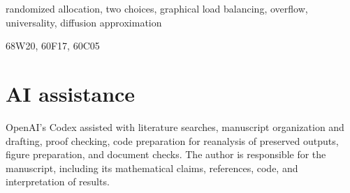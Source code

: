\documentclass[review,nohypdvips,hidelinks,onefignum,onetabnum]{siamart251216}
\begin{document}
\maketitle
\begin{abstract}
We determine which candidate information a reduced model must retain to predict
critical overflow in a fixed two-choice allocation rule.
Two communities of $q$ buckets have uniform bipartite internal sampling and
cross sampling of probability $\eps$. Each cross direction uses a predetermined
doubly stochastic kernel; ties favor the left endpoint.
For empty starts, $\eps q\to\lambda<\infty$, and integer capacity $c$ with
$2c/q\to\kappa>0$, we prove a common joint limit for imbalance and the
overflow curve on the $q^2$ arrival scale.
A coupling compares the actual fixed-kernel and product processes.
An exact midpoint evolution proves attraction to a unique two-side lattice profile.
The imbalance converges to a scalar diffusion whose drift averages the fast
common phase. Overflow retains the observation phase and the internal profile.
Community excess alone therefore misses a positive order-$q$ contribution to
expected overflow. At nominal capacity, expected overflow is order $q$,
while its fraction tends to zero.
Joint first Wasserstein convergence justifies both distributional and mean conclusions.
Certified profile evaluation and preserved samples assess the separate prediction
steps at specified finite-size tolerances. No effective uniform error bound
for the joint critical limit is asserted.
\end{abstract}
\begin{keywords}
randomized allocation, two choices, graphical load balancing, overflow,
universality, diffusion approximation
\end{keywords}
\begin{MSCcodes}
68W20, 60F17, 60C05
\end{MSCcodes}





\FloatBarrier

\FloatBarrier

\section*{AI assistance}
OpenAI's Codex assisted with literature searches, manuscript organization and
drafting, proof checking, code preparation for reanalysis of preserved outputs,
figure preparation, and document checks.
The author is responsible for the manuscript, including its mathematical claims,
references, code, and interpretation of results.


\end{document}
